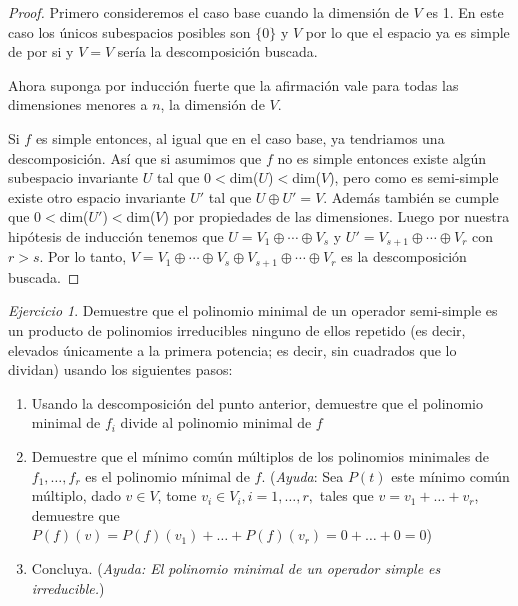 \documentclass[11pt,a4paper]{article}
\theoremstyle{definition}
\theoremstyle{remark}
\newtheorem{exc}{Ejercicio}
\begin{document}
\begin{proof}
	Primero consideremos el caso base cuando la dimensión de $ V $ es 1. En este caso los únicos subespacios posibles son $ \{0\} $ y $ V $ por lo que el espacio ya es simple de por si y $ V = V $ sería la descomposición buscada.
		
		Ahora suponga por inducción fuerte que la afirmación vale para todas las dimensiones menores a $ n $, la dimensión de $ V $.
		
		Si $ f $ es simple entonces, al igual que en el caso base,  ya tendriamos una descomposición. Así que si asumimos que $  f $ no es simple entonces existe algún subespacio invariante $ U $ tal que 0$ < $dim($ U $)$ < $dim($ V $), pero como es semi-simple existe otro espacio invariante $ U' $ tal que $ U \oplus U' = V $. Además también se cumple que  0$ < $dim($ U' $)$ < $dim($ V $) por propiedades de las dimensiones. Luego por nuestra hipótesis de inducción tenemos que $ U = V_1 \oplus \cdots \oplus V_s $ y $ U' = V_{s+1} \oplus \cdots \oplus V_{r} $ con $ r > s $. Por lo tanto, $ V = V_1 \oplus \cdots \oplus V_s \oplus V_{s+1} \oplus \cdots \oplus V_{r}$ es la descomposición buscada.
\end{proof}

\begin{exc}
	Demuestre que el polinomio minimal de un operador semi-simple es un producto de polinomios irreducibles ninguno de ellos repetido (es decir, elevados únicamente a la primera potencia; es decir, sin cuadrados que lo dividan) usando los siguientes pasos:
	\begin{enumerate}
		\item Usando la descomposición del punto anterior, demuestre que el polinomio minimal de $ f_i $ divide al polinomio minimal de $ f $
		\item Demuestre que el mínimo común múltiplos de los polinomios minimales de $ f_1, \ldots, f_r $  es el polinomio mínimal de $ f $. (\textit{Ayuda}: Sea $ P(t) $ este mínimo común múltiplo, dado $ v \in V $, tome $ v_i \in V_i, i = 1, \ldots, r, $ tales que $ v = v_1 + \ldots +v_r $, demuestre que $ P(f)(v) = P(f)(v_1) + \ldots + P(f)(v_r) = 0 + \ldots +0 = 0 $)
		\item Concluya. (\textit{Ayuda: El polinomio minimal de un operador simple es irreducible.})
		
	
	\end{enumerate}
\end{exc}
\end{document}
